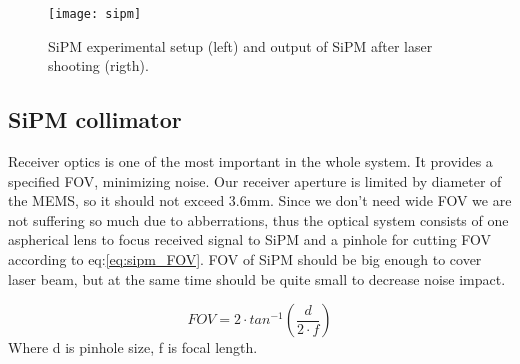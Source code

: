 \begin{figure}[H]
\texttt{[image: sipm]}
\caption{SiPM experimental setup (left) and output of SiPM after laser shooting (rigth).}
\label{fig:sipm_pde}
\end{figure}



\subsection{SiPM collimator}
Receiver optics is one of the most important in the whole system. It provides a specified FOV, minimizing noise. Our receiver aperture is limited by diameter of the MEMS, so it should not exceed 3.6mm.
Since we don't need wide FOV we are not suffering so much due to abberrations, thus the optical system consists of one aspherical lens to focus received signal to SiPM and a pinhole for cutting FOV according to eq:\ref{eq:sipm_FOV}.
FOV of SiPM should be big enough to cover laser beam, but at the same time should be quite small to decrease noise impact.


\begin{equation}\label{eq:sipm_FOV}
FOV = 2\cdot tan^{-1}(\frac{d}{2\cdot f})
\end{equation}
Where d is pinhole size, f is focal length.



\begin{figure}[h]
\begin{floatrow}
\end{floatrow}
\end{figure}


